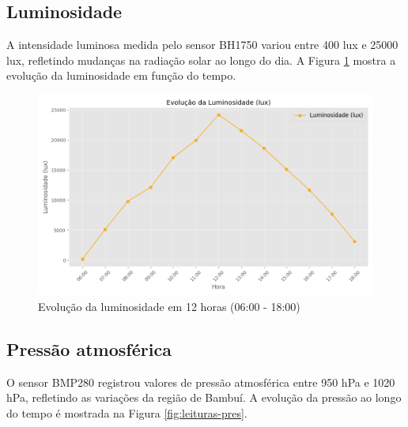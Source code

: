 \subsection{Luminosidade}
A intensidade luminosa medida pelo sensor BH1750 variou entre 400 lux e 25000 lux, refletindo mudanças na radiação solar ao longo do dia. A Figura \ref{fig:leituras-lum} mostra a evolução da luminosidade em função do tempo.

\begin{figure}[!htb] \centering
  \caption{Evolução da luminosidade em 12 horas (06:00 - 18:00)} \label{fig:leituras-lum}
  \begin{varwidth}{\linewidth}
    \includegraphics[width=16cm]{figuras/Luminosidade_lux.png}
  \end{varwidth}
\end{figure}

\subsection{Pressão atmosférica}
O sensor BMP280 registrou valores de pressão atmosférica entre 950 hPa e 1020 hPa, refletindo as variações da região de Bambuí. A evolução da pressão ao longo do tempo é mostrada na Figura \ref{fig:leituras-pres}.


